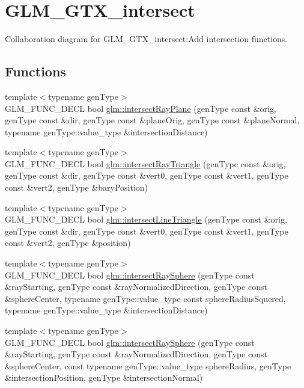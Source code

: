 \hypertarget{group__gtx__intersect}{
\section{GLM\_\-GTX\_\-intersect}
\label{group__gtx__intersect}
}


Collaboration diagram for GLM\_\-GTX\_\-intersect:Add intersection functions.  
\subsection*{Functions}
\begin{CompactItemize}
\item 
{\footnotesize template$<$typename genType$>$ }\\GLM\_\-FUNC\_\-DECL bool \hyperlink{group__gtx__intersect_g1699af184f5244ebe224fd653dd0bfc0}{glm::intersectRayPlane} (genType const \&orig, genType const \&dir, genType const \&planeOrig, genType const \&planeNormal, typename genType::value\_\-type \&intersectionDistance)
\item 
{\footnotesize template$<$typename genType$>$ }\\GLM\_\-FUNC\_\-DECL bool \hyperlink{group__gtx__intersect_gbf48f0fca6a10a8edb001b3d546de5fe}{glm::intersectRayTriangle} (genType const \&orig, genType const \&dir, genType const \&vert0, genType const \&vert1, genType const \&vert2, genType \&baryPosition)
\item 
{\footnotesize template$<$typename genType$>$ }\\GLM\_\-FUNC\_\-DECL bool \hyperlink{group__gtx__intersect_g1aa5d241478d1493ff4d8c22b8d9e293}{glm::intersectLineTriangle} (genType const \&orig, genType const \&dir, genType const \&vert0, genType const \&vert1, genType const \&vert2, genType \&position)
\item 
{\footnotesize template$<$typename genType$>$ }\\GLM\_\-FUNC\_\-DECL bool \hyperlink{group__gtx__intersect_g95b17f6f08015c92fc8ac3e83010492d}{glm::intersectRaySphere} (genType const \&rayStarting, genType const \&rayNormalizedDirection, genType const \&sphereCenter, typename genType::value\_\-type const sphereRadiusSquered, typename genType::value\_\-type \&intersectionDistance)
\item 
{\footnotesize template$<$typename genType$>$ }\\GLM\_\-FUNC\_\-DECL bool \hyperlink{group__gtx__intersect_g2e6a97dd3fcdbf83c24dd3499f81014b}{glm::intersectRaySphere} (genType const \&rayStarting, genType const \&rayNormalizedDirection, genType const \&sphereCenter, const typename genType::value\_\-type sphereRadius, genType \&intersectionPosition, genType \&intersectionNormal)

\end{CompactItemize}
